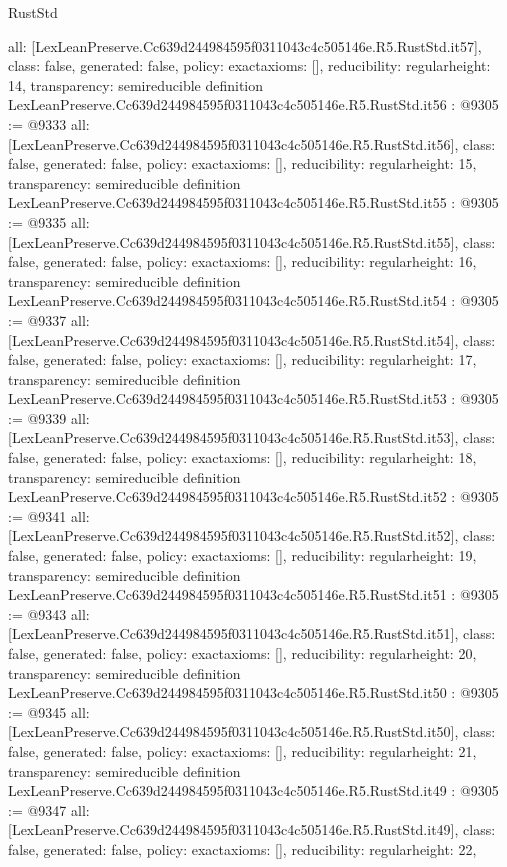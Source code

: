 \begin{lexlean}{RustStd}
\begin{coremodule}
{  all: [LexLeanPreserve.Cc639d244984595f0311043c4c505146e.R5.RustStd.it57],
  class: false,
  generated: false,
  policy: exact{axioms: []},
  reducibility: regular{height: 14},
  transparency: semireducible
}
definition LexLeanPreserve.Cc639d244984595f0311043c4c505146e.R5.RustStd.it56 : @9305 := @9333 {
  all: [LexLeanPreserve.Cc639d244984595f0311043c4c505146e.R5.RustStd.it56],
  class: false,
  generated: false,
  policy: exact{axioms: []},
  reducibility: regular{height: 15},
  transparency: semireducible
}
definition LexLeanPreserve.Cc639d244984595f0311043c4c505146e.R5.RustStd.it55 : @9305 := @9335 {
  all: [LexLeanPreserve.Cc639d244984595f0311043c4c505146e.R5.RustStd.it55],
  class: false,
  generated: false,
  policy: exact{axioms: []},
  reducibility: regular{height: 16},
  transparency: semireducible
}
definition LexLeanPreserve.Cc639d244984595f0311043c4c505146e.R5.RustStd.it54 : @9305 := @9337 {
  all: [LexLeanPreserve.Cc639d244984595f0311043c4c505146e.R5.RustStd.it54],
  class: false,
  generated: false,
  policy: exact{axioms: []},
  reducibility: regular{height: 17},
  transparency: semireducible
}
definition LexLeanPreserve.Cc639d244984595f0311043c4c505146e.R5.RustStd.it53 : @9305 := @9339 {
  all: [LexLeanPreserve.Cc639d244984595f0311043c4c505146e.R5.RustStd.it53],
  class: false,
  generated: false,
  policy: exact{axioms: []},
  reducibility: regular{height: 18},
  transparency: semireducible
}
definition LexLeanPreserve.Cc639d244984595f0311043c4c505146e.R5.RustStd.it52 : @9305 := @9341 {
  all: [LexLeanPreserve.Cc639d244984595f0311043c4c505146e.R5.RustStd.it52],
  class: false,
  generated: false,
  policy: exact{axioms: []},
  reducibility: regular{height: 19},
  transparency: semireducible
}
definition LexLeanPreserve.Cc639d244984595f0311043c4c505146e.R5.RustStd.it51 : @9305 := @9343 {
  all: [LexLeanPreserve.Cc639d244984595f0311043c4c505146e.R5.RustStd.it51],
  class: false,
  generated: false,
  policy: exact{axioms: []},
  reducibility: regular{height: 20},
  transparency: semireducible
}
definition LexLeanPreserve.Cc639d244984595f0311043c4c505146e.R5.RustStd.it50 : @9305 := @9345 {
  all: [LexLeanPreserve.Cc639d244984595f0311043c4c505146e.R5.RustStd.it50],
  class: false,
  generated: false,
  policy: exact{axioms: []},
  reducibility: regular{height: 21},
  transparency: semireducible
}
definition LexLeanPreserve.Cc639d244984595f0311043c4c505146e.R5.RustStd.it49 : @9305 := @9347 {
  all: [LexLeanPreserve.Cc639d244984595f0311043c4c505146e.R5.RustStd.it49],
  class: false,
  generated: false,
  policy: exact{axioms: []},
  reducibility: regular{height: 22},
}
\end{coremodule}
\end{lexlean}
